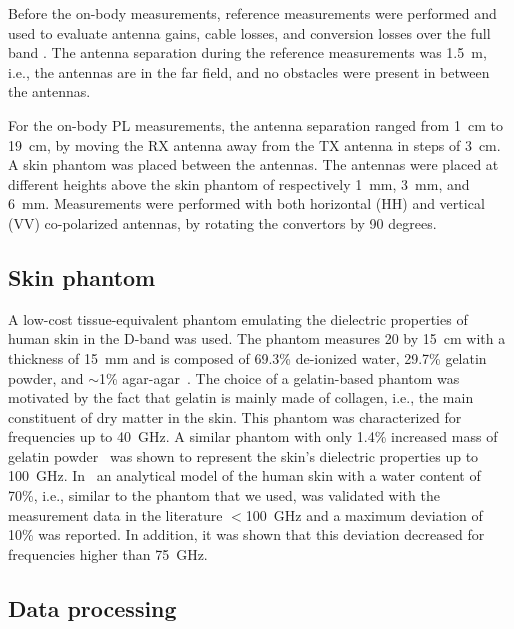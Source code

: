 \documentclass[manuscript]{rsl}
\begin{document}
Before the on-body measurements, reference measurements were performed and used to evaluate antenna gains, cable losses, and conversion losses over the full band \cite{DeBeelde2021_eucap}. 
The antenna separation during the reference measurements was 1.5~m, i.e., the antennas are in the far field, and no obstacles were present in between the antennas. 

For the on-body PL measurements, the antenna separation ranged from 1~cm to 19~cm, by moving the RX antenna away from the TX antenna in steps of 3~cm.
A skin phantom was placed between the antennas. 
The antennas were placed at different heights above the skin phantom of respectively 1~mm, 3~mm, and 6~mm. 
Measurements were performed with both horizontal (HH) and vertical (VV) co-polarized antennas, by rotating the convertors by 90 degrees.

\subsection{Skin phantom}

A low-cost tissue-equivalent phantom emulating the dielectric properties of human skin in the D-band was used. 
The phantom measures 20 by 15~cm with a thickness of 15~mm and is composed of 69.3\% de-ionized water, 29.7\% gelatin powder, and $\sim$1\% agar-agar~\cite{aminzadeh2014_ELetters}. 
The choice of a gelatin-based phantom was motivated by the fact that gelatin is mainly made of collagen, i.e., the main constituent of dry matter in the skin. 
This phantom was characterized for frequencies up to 40~GHz. 
A similar phantom with only 1.4\% increased mass of gelatin powder~\cite{aminzadeh2017_awpl} was shown to represent the skin's dielectric properties up to 100~GHz. 
In~\cite{aminzadeh2014_thesis} an analytical model of the human skin with a water content of 70\%, i.e., similar to the phantom that we used, was validated with the measurement data in the literature $<$100~GHz and a maximum deviation of 10\% was reported. 
In addition, it was shown that this deviation decreased for frequencies higher than 75~GHz.

\subsection{Data processing}
\end{document}
